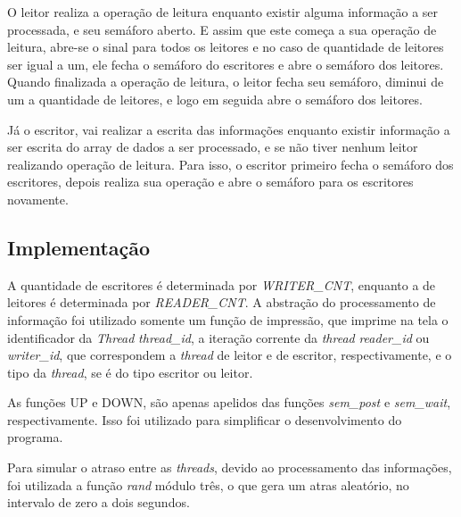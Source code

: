 \documentclass[a4paper, 11pt]{article}
\begin{document}
O leitor realiza a operação de leitura enquanto existir alguma informação a ser processada, e seu semáforo aberto. E assim que este começa a sua operação de leitura, abre-se o sinal para todos os leitores e no caso de quantidade de leitores ser igual a um, ele fecha o semáforo do escritores e abre o semáforo dos leitores. Quando finalizada a operação de leitura, o leitor fecha seu semáforo, diminui de um a quantidade de leitores, e logo em seguida abre o semáforo dos leitores.

Já o escritor, vai realizar a escrita das informações enquanto existir informação a ser escrita do array de dados a ser processado, e se não tiver nenhum leitor realizando operação de leitura. Para isso, o escritor primeiro fecha o semáforo dos escritores, depois realiza sua operação e abre o semáforo para os escritores novamente.

\subsection{Implementação}
A quantidade de escritores é determinada por \textit{WRITER\_CNT}, enquanto a de leitores é determinada por \textit{READER\_CNT}. A abstração do processamento de informação foi utilizado somente um função de impressão, que imprime na tela o identificador da \textit{Thread} \textit{thread\_id}, a iteração corrente da \textit{thread} \textit{reader\_id} ou \textit{writer\_id}, que correspondem a \textit{thread} de leitor e de escritor, respectivamente, e o tipo da \textit{thread}, se é do tipo escritor ou leitor.

As funções UP e DOWN, são apenas apelidos das funções \textit{sem\_post} e \textit{sem\_wait}, respectivamente. Isso foi utilizado para simplificar o desenvolvimento do programa.

Para simular o atraso entre as \textit{threads}, devido ao processamento das informações, foi utilizada a função \textit{rand} módulo três, o que gera um atras aleatório, no intervalo de zero a dois segundos.
\end{document}
